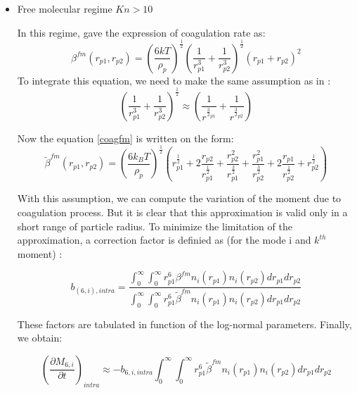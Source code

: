 \begin{itemize}
\item Free molecular regime $Kn > 10$

In this regime, \citet{Friedlander-1977} gave the expression of coagulation rate 
as:
\begin{equation}
\beta^{fm}(r_{p1},r_{p2}) = \left(\frac{6 k 
T}{\rho_p}\right)^{\frac{1}{2}}\left(\frac{1}{r^3_{p1}} 
+ \frac{1}{r^3_{p2}}\right)^{\frac{1}{2}} (r_{p1} + r_{p2})^2 
\label{coagfm}
\end{equation}
To integrate this equation, we need to make the same assumption as in 
\citet{Lee-1984}:
 \begin{equation}
\left(\frac{1}{r^3_{p1}} + \frac{1}{r^3_{p2}}\right)^{\frac{1}{2}} \approx 
\left(\frac{1}{r^{\frac{3}{2}_{p1}}} 
                                                               + 
\frac{1}{r^{\frac{3}{2}_{p2}}}\right)
\label{coag_ap}
\end{equation}

Now the equation \ref{coagfm} is written on the form:
\begin{equation}
\widetilde{\beta}^{fm}(r_{p1},r_{p2})
= \left(\frac{6 k_B T}{\rho_p}\right)^{\frac{1}{2}}
\left(r^{\frac{1}{2}}_{p1} + 2 \frac{r_{p2}}{r^{\frac{1}{2}}_{p1}} + 
\frac{r_{p2}^2}{r^{\frac{3}{2}}_{p1}} 
+ \frac{r_{p1}^2}{r^{\frac{3}{2}}_{p2}} +  2\frac{r_{p1}}{r^{\frac{1}{2}}_{p2}} 
+ r^{\frac{1}{2}}_{p2}\right)
\end{equation}

With this assumption, we can compute the variation of the moment due to 
coagulation process. But it is clear that this approximation is valid only in a 
short range of particle radius. To minimize the limitation of the 
approximation, a correction factor is definied 
as (for the mode i and $k^{th}$ moment) :


\begin{equation}
\label{coag_betafm}
b_{(6,i),intra} = \frac{\int_{0}^{\infty} \int_{0}^{\infty} r_{p1}^6 \beta^{fm} 
n_i(r_{p1}) n_i(r_{p2}) dr_{p1} dr_{p2}}
{\int_{0}^{\infty} \int_{0}^{\infty} r_{p1}^6 \widetilde{\beta}^{fm} n_i(r_{p1}) 
n_i(r_{p2}) dr_{p1} dr_{p2}}
\end{equation}

These factors are tabulated  in function of the log-normal 
parameters.
Finally, we obtain:

\begin{equation}
(\frac{\partial M_{6,i}}{\partial t})_{intra}  \approx - b_{6,i,intra} 
\int_{0}^{\infty} \int_{0}^{\infty} r_{p1}^6 \widetilde{\beta}^{fm} n_i(r_{p1}) 
n_i(r_{p2}) dr_{p1} dr_{p2}
\label{coag_betafm}
\end{equation}



\end{itemize}
